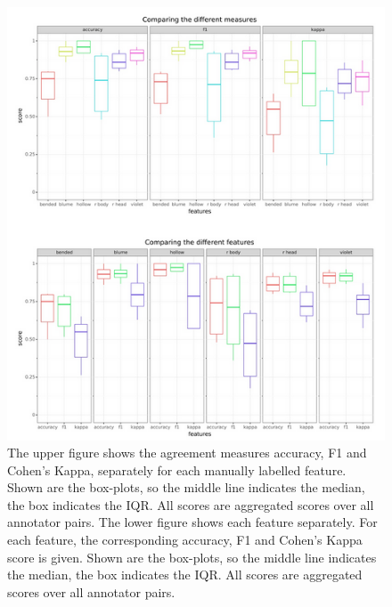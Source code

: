 \begin{figure}[h]
	\centering
	\includegraphics[scale=0.6]{Figures/chapter03/kappacompare}
	\decoRule
	\caption[Agreement measures]{The upper figure shows the agreement measures accuracy, F1 and Cohen’s Kappa, separately for each manually labelled feature. Shown are the box-plots, so the middle line indicates the median, the box indicates the IQR. All scores are aggregated scores over all annotator pairs. The lower figure shows each feature separately. For each feature, the corresponding accuracy, F1 and Cohen’s Kappa score is given. Shown are the box-plots, so the middle line indicates the median, the box indicates the IQR. All scores are aggregated scores over all annotator pairs.}
	\label{fig:KappaCompare}
\end{figure}

